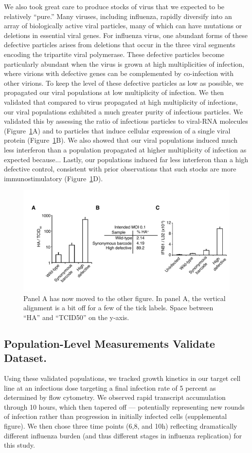 \documentclass[9pt,lineno]{elife}
\begin{document}
We also took great care to produce stocks of virus that we expected to be relatively ``pure.''
Many viruses, including influenza, rapidly diversify into an array of biologically active viral particles, many of which can have mutations or deletions in essential viral genes.
For influenza virus, one abundant forms of these defective particles arises from deletions that occur in the three viral segments encoding the tripartite viral polymerase.
These defective particles become particularly abundant when the virus is grown at high multiplicities of infection, where virions with defective genes can be complemented by co-infection with other virions.
To keep the level of these defective particles as low as possible, we propagated our viral populations at low multiplicity of infection.
We then validated that compared to virus propagated at high multiplicity of infections, our viral populations exhibited a much greater purity of infectious particles.
We validated this by assessing the ratio of infectious particles to viral-RNA molecules (Figure~\ref{fig:viruspopulations}A) and to particles that induce cellular expression of a single viral protein (Figure~\ref{fig:viruspopulations}B).
We also showed that our viral populations induced much less interferon than a population propagated at higher multiplicity of infection as expected because...
Lastly, our populations induced far less interferon than a high defective control, consistent with prior observations that such stocks are more immunostimulatory (Figure~\ref{fig:viruspopulations}D).

\begin{figure}
\includegraphics[width=0.7\linewidth]{figures/Validating_barcode_virus/validating_populations_D02.pdf}
\caption{\label{fig:viruspopulations}
Panel A has now moved to the other figure.
In panel A, the vertical alignment is a bit off for a few of the tick labels.
Space between ``HA'' and ``TCID50'' on the y-axis.}
\end{figure}

\subsection{Population-Level Measurements Validate Dataset.}
Using these validated populations, we tracked growth kinetics in our target cell line at an infectious dose targeting a final infection rate of 5 percent as determined by flow cytometry. 
We observed rapid transcript accumulation through 10 hours, which then tapered off --- potentially representing new rounds of infection rather than progression in initially infected cells (supplemental figure). 
We then chose three time points (6,8, and 10h) reflecting dramatically different influenza burden (and thus different stages in influenza replication) for this study.
\end{document}
